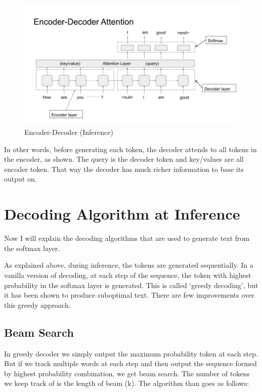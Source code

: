 \documentclass[]{krantz}
\begin{document}
\begin{figure}
\centering
\includegraphics{figures/encoder_decoder_attn.jpg}
\caption{Encoder-Decoder (Inference)}
\end{figure}

In other words, before generating each token, the decoder attends to all tokens in the encoder, as shown. The query is the decoder token and key/values are all encoder token. That way the decoder has much richer information to base its output on.

\hypertarget{decoding-algorithm-at-inference}{%
\section{Decoding Algorithm at Inference}\label{decoding-algorithm-at-inference}}

Now I will explain the decoding algorithms that are used to generate text from the softmax layer.

As explained above, during inference, the tokens are generated sequentially. In a vanilla version of decoding, at each step of the sequence, the token with highest probability in the softmax layer is generated. This is called `greedy decoding', but it has been shown to produce suboptimal text. There are few improvements over this greedy approach.

\hypertarget{beam-search}{%
\subsection{Beam Search}\label{beam-search}}

In greedy decoder we simply output the maximum probability token at each step. But if we track multiple words at each step and then output the sequence formed by highest probability combination, we get beam search. The number of tokens we keep track of is the length of beam (k). The algorithm than goes as follows:
\end{document}
